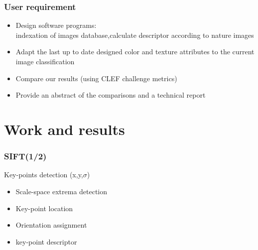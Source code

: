 \documentclass[xcolor=table]{beamer}
\begin{document}
\begin{frame} \frametitle{User requirement}


\begin{itemize}
 \item Design  software programs:\\
   indexation of  images database,calculate descriptor according to  nature images
\item Adapt the last up to date designed color and texture attributes to the current image classification
\item Compare our results (using CLEF challenge metrics)
\item Provide an abstract of the comparisons and a technical report
\end{itemize}

\end{frame}


\section{Work and results}
\begin{frame} \frametitle{SIFT(1/2)}

Key-points detection (x,y,$\sigma$)
\begin{itemize}

\item Scale-space extrema detection\\


\item  Key-point location\\


\item Orientation assignment\\


\item key-point descriptor
\\

\end{itemize}
\end{frame}
\end{document}
